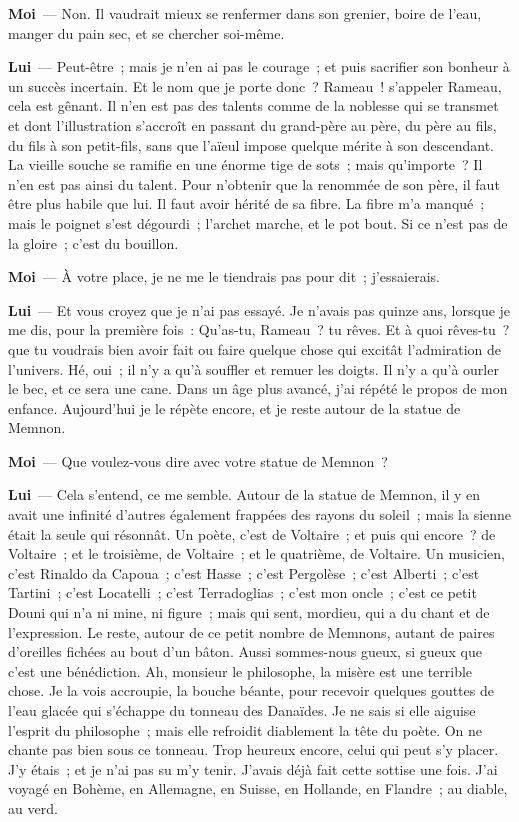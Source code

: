 \documentclass[french,twoside]{book} %
\newcommand{\labelchar}[1]{\textbf{\color{rubric} #1}}
\begin{document}
\labelchar{Moi} — Non. Il vaudrait mieux se renfermer dans son grenier, boire de l’eau, manger du pain sec, et se chercher soi-même.\par
\labelchar{Lui} — Peut-être ; mais je n’en ai pas le courage ; et puis sacrifier son bonheur à un succès incertain. Et le nom que je porte donc ? Rameau ! s’appeler Rameau, cela est gênant. Il n’en est pas des talents comme de la noblesse qui se transmet et dont l’illustration s’accroît en passant du grand-père au père, du père au fils, du fils à son petit-fils, sans que l’aïeul impose quelque mérite à son descendant. La vieille souche se ramifie en une énorme tige de sots ; mais qu’importe ? Il n’en est pas ainsi du talent. Pour n’obtenir que la renommée de son père, il faut être plus habile que lui. Il faut avoir hérité de sa fibre. La fibre m’a manqué ; mais le poignet s’est dégourdi ; l’archet marche, et le pot bout. Si ce n’est pas de la gloire ; c’est du bouillon.\par
\labelchar{Moi} — À votre place, je ne me le tiendrais pas pour dit ; j’essaierais.\par
\labelchar{Lui} — Et vous croyez que je n’ai pas essayé. Je n’avais pas quinze ans, lorsque je me dis, pour la première fois : Qu’as-tu, Rameau ? tu rêves. Et à quoi rêves-tu ? que tu voudrais bien avoir fait ou faire quelque chose qui excitât l’admiration de l’univers. Hé, oui ; il n’y a qu’à souffler et remuer les doigts. Il n’y a qu’à ourler le bec, et ce sera une cane. Dans un âge plus avancé, j’ai répété le propos de mon enfance. Aujourd’hui je le répète encore, et je reste autour de la statue de Memnon.\par
\labelchar{Moi} — Que voulez-vous dire avec votre statue de Memnon ?\par
\labelchar{Lui} — Cela s’entend, ce me semble. Autour de la statue de Memnon, il y en avait une infinité d’autres également frappées des rayons du soleil ; mais la sienne était la seule qui résonnât. Un poète, c’est de Voltaire ; et puis qui encore ? de Voltaire ; et le troisième, de Voltaire ; et le quatrième, de Voltaire. Un musicien, c’est Rinaldo da Capoua ; c’est Hasse ; c’est Pergolèse ; c’est Alberti ; c’est Tartini ; c’est Locatelli ; c’est Terradoglias ; c’est mon oncle ; c’est ce petit Douni qui n’a ni mine, ni figure ; mais qui sent, mordieu, qui a du chant et de l’expression. Le reste, autour de ce petit nombre de Memnons, autant de paires d’oreilles fichées au bout d’un bâton. Aussi sommes-nous gueux, si gueux que c’est une bénédiction. Ah, monsieur le philosophe, la misère est une terrible chose. Je la vois accroupie, la bouche béante, pour recevoir quelques gouttes de l’eau glacée qui s’échappe du tonneau des Danaïdes. Je ne sais si elle aiguise l’esprit du philosophe ; mais elle refroidit diablement la tête du poète. On ne chante pas bien sous ce tonneau. Trop heureux encore, celui qui peut s’y placer. J’y étais ; et je n’ai pas su m’y tenir. J’avais déjà fait cette sottise une fois. J’ai voyagé en Bohème, en Allemagne, en Suisse, en Hollande, en Flandre ; au diable, au verd.\par
\end{document}
